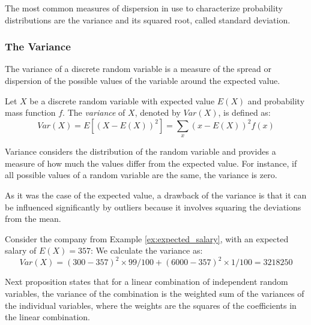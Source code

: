 The most common measures of dispersion in use to characterize probability distributions are the variance and its squared root, called standard deviation.


\subsubsection*{The Variance}

The variance of a discrete random variable is a measure of the spread or dispersion of the possible values of the variable around the expected value.

\begin{definition}
Let $X$ be a discrete random variable with expected value $E(X)$ and probability mass function $f$. The \emph{variance} of $X$, denoted by $Var(X)$, is defined as:
\[
Var(X) = E[(X - E(X))^2] = \sum_{x} (x - E(X))^2 f(x)
\]
\end{definition}

Variance considers the distribution of the random variable and provides a measure of how much the values differ from the expected value. For instance, if all possible values of a random variable are the same, the variance is zero.

As it was the case of the expected value, a drawback of the variance is that it can be influenced significantly by outliers because it involves squaring the deviations from the mean.

\begin{example}
Consider the company from Example \ref{ex:expected_salary}, with an expected salary of $E(X) = 357$: We calculate the variance as:
\[
Var(X) = (300 - 357)^2 \times 99/100 + (6000 - 357)^2 \times 1/100 = 3218250
\]
\end{example}

Next proposition states that for a linear combination of independent random variables, the variance of the combination is the weighted sum of the variances of the individual variables, where the weights are the squares of the coefficients in the linear combination.


